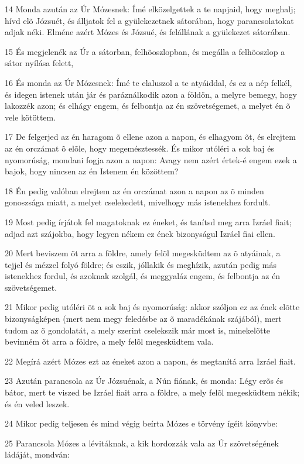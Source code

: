 \par 14 Monda azután az Úr Mózesnek: Ímé elközelgettek a te napjaid, hogy meghalj; hívd elõ Józsuét, és álljatok fel a gyülekezetnek sátorában, hogy parancsolatokat adjak néki. Elméne azért Mózes és Józsué, és felállának a gyülekezet sátorában.
\par 15 És megjelenék az Úr a sátorban, felhõoszlopban, és megálla a felhõoszlop a sátor nyílása felett,
\par 16 És monda az Úr Mózesnek: Ímé te elaluszol a te atyáiddal, és ez a nép felkél, és idegen istenek után jár és paráználkodik azon a földön, a melyre bemegy, hogy lakozzék azon; és elhágy engem, és felbontja az én szövetségemet, a melyet én õ vele kötöttem.
\par 17 De felgerjed az én haragom õ ellene azon a napon, és elhagyom õt, és elrejtem  az én orczámat õ elõle, hogy megemésztessék. És mikor utóléri a sok baj és nyomorúság, mondani fogja azon a napon: Avagy nem azért értek-é engem ezek a bajok, hogy nincsen az én Istenem én közöttem?
\par 18 Én pedig valóban elrejtem az én orczámat azon a napon az õ minden gonoszsága miatt, a melyet cselekedett, mivelhogy más istenekhez fordult.
\par 19 Most pedig írjátok fel magatoknak ez éneket, és tanítsd meg arra Izráel fiait; adjad azt szájokba, hogy legyen nékem ez ének bizonyságul Izráel fiai ellen.
\par 20 Mert beviszem õt arra a földre, amely felõl megesküdtem az õ atyáinak, a tejjel és mézzel folyó földre; és eszik, jóllakik és meghízik, azután pedig  más istenekhez fordul, és azoknak szolgál, és meggyaláz engem, és felbontja az én szövetségemet.
\par 21 Mikor pedig utóléri õt a sok baj és nyomorúság: akkor szóljon ez az ének elõtte bizonyságképen (mert nem megy feledésbe az õ maradékának szájából), mert tudom az õ gondolatát, a mely szerint cselekszik már most is, minekelõtte bevinném õt arra a földre, a mely felõl megesküdtem vala.
\par 22 Megírá azért Mózes ezt az éneket azon a napon, és megtanítá arra Izráel fiait.
\par 23 Azután parancsola az Úr Józsuénak, a Nún fiának, és monda: Légy erõs  és bátor, mert te viszed be Izráel fiait arra a földre, a mely felõl megesküdtem nékik; és én veled leszek.
\par 24 Mikor pedig teljesen és mind végig beírta Mózes e törvény ígéit könyvbe:
\par 25 Parancsola Mózes a lévitáknak, a kik hordozzák vala az Úr szövetségének ládáját, mondván:
